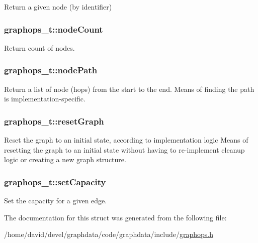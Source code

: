 Return a given node (by identifier) 

\subsubsection[{\texorpdfstring{node\+Count}{nodeCount}}]{ graphops\+\_\+t\+::node\+Count}\hypertarget{structgraphops__t_a07801b43de87d48f426d7abf7959e738}{}\label{structgraphops__t_a07801b43de87d48f426d7abf7959e738}


Return count of nodes. 

\subsubsection[{\texorpdfstring{node\+Path}{nodePath}}]{ graphops\+\_\+t\+::node\+Path}\hypertarget{structgraphops__t_afd2a0b194e922fa656b4352a8fed9e05}{}\label{structgraphops__t_afd2a0b194e922fa656b4352a8fed9e05}


Return a list of node (hops) from the start to the end. Means of finding the path is implementation-\/specific. 

\subsubsection[{\texorpdfstring{reset\+Graph}{resetGraph}}]{ graphops\+\_\+t\+::reset\+Graph}\hypertarget{structgraphops__t_a5e4e69eeeb8e25607c3af5dfcdbb88aa}{}\label{structgraphops__t_a5e4e69eeeb8e25607c3af5dfcdbb88aa}


Reset the graph to an initial state, according to implementation logic Means of resetting the graph to an initial state without having to re-\/implement cleanup logic or creating a new graph structure. 

\subsubsection[{\texorpdfstring{set\+Capacity}{setCapacity}}]{ graphops\+\_\+t\+::set\+Capacity}\hypertarget{structgraphops__t_a6f05f8daf75bc380988e20e019681c0a}{}\label{structgraphops__t_a6f05f8daf75bc380988e20e019681c0a}
Set the capacity for a given edge. 

The documentation for this struct was generated from the following file\+:\begin{DoxyCompactItemize}
\item 
/home/david/devel/graphdata/code/graphdata/include/\hyperlink{graphops_8h}{graphops.\+h}\end{DoxyCompactItemize}
